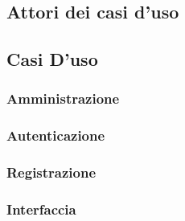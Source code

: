 \subsection{Attori dei casi d'uso}

\newpage
\subsection{Casi D'uso}

	\subsubsection{Amministrazione}
	
	\newpage
	
	\subsubsection{Autenticazione}
	
	\newpage
	
	\subsubsection{Registrazione}
	
	\newpage
	
	\subsubsection{Interfaccia}
	
	\newpage


